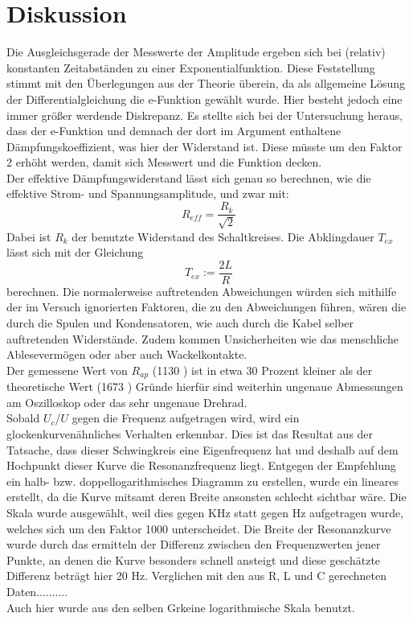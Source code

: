 \section{Diskussion}

Die Ausgleichsgerade der Messwerte der Amplitude ergeben sich bei (relativ) konstanten Zeitabständen zu einer Exponentialfunktion. Diese Feststellung stimmt mit den Überlegungen aus der Theorie überein, da als allgemeine Lösung der Differentialgleichung die e-Funktion gewählt wurde. Hier besteht jedoch eine immer größer werdende Diskrepanz. Es stellte sich bei der Untersuchung heraus, dass der e-Funktion und demnach der dort im Argument enthaltene Dämpfungskoeffizient, was hier der Widerstand ist. Diese müsste um den Faktor 2 erhöht werden, damit sich Messwert und die Funktion decken. 
\\
Der effektive Dämpfungswiderstand lässt sich genau so berechnen, wie die effektive Strom- und Spannungsamplitude, und zwar mit:
\begin{equation}
    R_{eff} = \frac{R_k}{\sqrt{2}} 
\end{equation}
Dabei ist \(R_k\) der benutzte Widerstand des Schaltkreises.
Die Abklingdauer \(T_{ex}\) lässt sich mit der Gleichung
\begin{equation}
    T_{ex} := \frac{2L}{R}
\end{equation}
berechnen.
Die normalerweise auftretenden Abweichungen würden sich mithilfe der im Versuch ignorierten Faktoren, die zu den Abweichungen führen, wären die durch die Spulen und Kondensatoren, wie auch durch die Kabel selber auftretenden Widerstände. Zudem kommen Unsicherheiten wie das menschliche Ablesevermögen oder aber auch Wackelkontakte.
\\
Der gemessene Wert von \(R_{ap}\) (1130 \Omega) ist in etwa 30 Prozent kleiner als der theoretische Wert (1673 \Omega) %
Gründe hierfür sind weiterhin ungenaue Abmessungen am Oszilloskop oder das sehr ungenaue Drehrad.
\\
Sobald \(U_c\)/\(U\) gegen die Frequenz aufgetragen wird, wird ein glockenkurvenähnliches Verhalten erkennbar. Dies ist das Resultat aus der Tatsache, dass dieser Schwingkreis eine Eigenfrequenz hat und deshalb auf dem Hochpunkt dieser Kurve die Resonanzfrequenz liegt. Entgegen der Empfehlung ein halb- bzw. doppellogarithmisches Diagramm zu erstellen, wurde ein lineares erstellt, da die Kurve mitsamt deren Breite ansonsten schlecht sichtbar wäre. Die Skala wurde ausgewählt, weil dies gegen KHz statt gegen Hz aufgetragen wurde, welches sich um den Faktor 1000 unterscheidet. Die Breite der Resonanzkurve wurde durch das ermitteln der Differenz zwischen den Frequenzwerten jener Punkte, an denen die Kurve besonders schnell ansteigt und diese geschätzte Differenz beträgt hier 20 Hz. Verglichen mit den aus R, L und C gerechneten Daten..........
\\
Auch hier wurde aus den selben Grkeine logarithmische Skala benutzt.

\label{sec:Diskussion}

